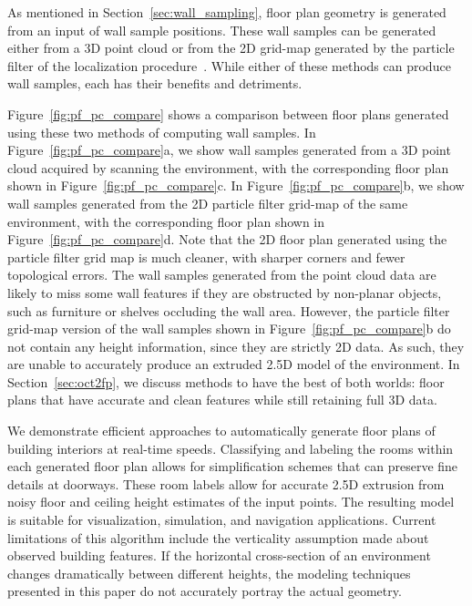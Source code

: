 \documentclass[12pt,onecolumn,oneside]{book}
\begin{document}
As mentioned in Section~\ref{sec:wall_sampling}, floor plan geometry is generated from an input of wall sample positions.  These wall samples can be generated either from a 3D point cloud or from the 2D grid-map generated by the particle filter of the localization procedure~\cite{NickJournal}.  While either of these methods can produce wall samples, each has their benefits and detriments.

Figure~\ref{fig:pf_pc_compare} shows a comparison between floor plans generated using these two methods of computing wall samples.  In Figure~\ref{fig:pf_pc_compare}a, we show wall samples generated from a 3D point cloud acquired by scanning the environment, with the corresponding floor plan shown in Figure~\ref{fig:pf_pc_compare}c.  In Figure~\ref{fig:pf_pc_compare}b, we show wall samples generated from the 2D particle filter grid-map of the same environment, with the corresponding floor plan shown in Figure~\ref{fig:pf_pc_compare}d.  Note that the 2D floor plan generated using the particle filter grid map is much cleaner, with sharper corners and fewer topological errors.  The wall samples generated from the point cloud data are likely to miss some wall features if they are obstructed by non-planar objects, such as furniture or shelves occluding the wall area.  However, the particle filter grid-map version of the wall samples shown in Figure~\ref{fig:pf_pc_compare}b do not contain any height information, since they are strictly 2D data.  As such, they are unable to accurately produce an extruded 2.5D model of the environment.  In Section~\ref{sec:oct2fp}, we discuss methods to have the best of both worlds:  floor plans that have accurate and clean features while still retaining full 3D data.

We demonstrate efficient approaches to automatically generate floor plans of building interiors at real-time speeds.  Classifying and labeling the rooms within each generated floor plan allows for simplification schemes that can preserve fine details at doorways.  These room labels allow for accurate 2.5D extrusion from noisy floor and ceiling height estimates of the input points.  The resulting model is suitable for visualization, simulation, and navigation applications.  Current limitations of this algorithm include the verticality assumption made about observed building features.  If the horizontal cross-section of an environment changes dramatically between different heights, the modeling techniques presented in this paper do not accurately portray the actual geometry.
\end{document}
